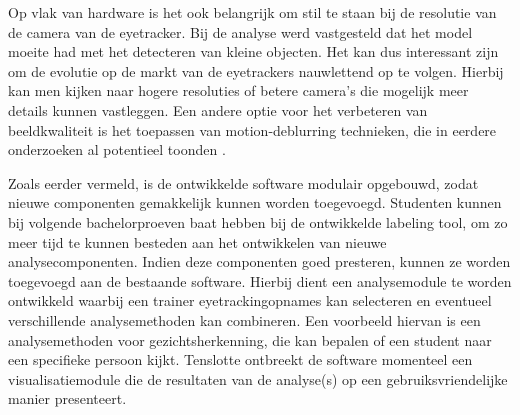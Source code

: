 Op vlak van hardware is het ook belangrijk om stil te staan bij de resolutie van de camera van de eyetracker.
Bij de analyse werd vastgesteld dat het model moeite had met het detecteren van kleine objecten.
Het kan dus interessant zijn om de evolutie op de markt van de eyetrackers nauwlettend op te volgen.
Hierbij kan men kijken naar hogere resoluties of betere camera's die mogelijk meer details kunnen vastleggen.
Een andere optie voor het verbeteren van beeldkwaliteit is het toepassen van motion-deblurring technieken, 
die in eerdere onderzoeken al potentieel toonden \autocite{Cederin2023}.

Zoals eerder vermeld, is de ontwikkelde software modulair opgebouwd, zodat\\ nieuwe componenten gemakkelijk kunnen worden toegevoegd.
Studenten kunnen bij volgende bachelorproeven baat hebben bij de ontwikkelde labeling tool, om zo meer tijd te kunnen besteden aan het ontwikkelen van nieuwe analysecomponenten.
Indien deze componenten goed presteren, kunnen ze worden toegevoegd aan de bestaande software. 
Hierbij dient een analysemodule te worden ontwikkeld waarbij een trainer eyetrackingopnames kan selecteren en eventueel verschillende analysemethoden kan combineren.
Een voorbeeld hiervan is een analysemethoden voor gezichtsherkenning, die kan bepalen of een student naar een specifieke persoon kijkt.
Tenslotte ontbreekt de software momenteel een visualisatiemodule die de resultaten van de analyse(s) op een gebruiksvriendelijke manier presenteert.

